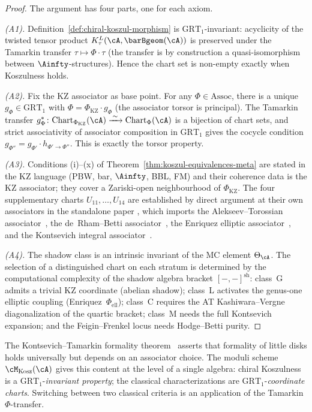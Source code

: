 \begin{proof}
The argument has four parts, one for each axiom.

\emph{(A1).} Definition~\ref{def:chiral-koszul-morphism} is
$\mathrm{GRT}_1$-invariant: acyclicity of the twisted tensor
product $K_\tau^L(\cA, \barBgeom(\cA))$ is preserved under the
Tamarkin transfer $\tau \mapsto \Phi \cdot \tau$ (the transfer
is by construction a quasi-isomorphism between
$\Ainfty$-structures). Hence the chart set is non-empty exactly
when Koszulness holds.

\emph{(A2).} Fix the KZ associator as base point. For any
$\Phi \in \mathrm{Assoc}$, there is a unique
$g_\Phi \in \mathrm{GRT}_1$ with
$\Phi = \Phi_{\mathrm{KZ}} \cdot g_\Phi$ (the associator torsor
is principal). The Tamarkin transfer
$g_\Phi^*\colon
\mathrm{Chart}_{\Phi_{\mathrm{KZ}}}(\cA) \xrightarrow{\;\sim\;}
\mathrm{Chart}_\Phi(\cA)$
is a bijection of chart sets, and strict associativity of
associator composition in $\mathrm{GRT}_1$ gives the cocycle
condition
$g_{\Phi''} = g_{\Phi'} \cdot h_{\Phi' \to \Phi''}$.
This is exactly the torsor property.

\emph{(A3).} Conditions (i)--(x) of
Theorem~\ref{thm:koszul-equivalences-meta} are stated in the KZ
language (PBW, bar, $\Ainfty$, BBL, FM) and their coherence data
is the KZ associator; they cover a Zariski-open neighbourhood
of $\Phi_{\mathrm{KZ}}$. The four supplementary charts
$U_{11}, \ldots, U_{14}$ are established by direct argument at
their own associators in the standalone paper
\cite[Propositions~2.5--2.8]{LorgatMKD1_stand}, which imports
the Alekseev--Torossian associator~\cite{AT12}, the de~Rham--Betti
associator~\cite{Deligne89}, the Enriquez elliptic
associator~\cite{Enriquez14}, and the Kontsevich integral
associator~\cite{Kontsevich93}.

\emph{(A4).} The shadow class is an intrinsic invariant of the
MC element $\Theta_\cA$. The selection of a distinguished chart
on each stratum is determined by the computational complexity
of the shadow algebra bracket $[-,-]^{\mathrm{sh}}$: class~G
admits a trivial KZ coordinate (abelian shadow); class~L
activates the genus-one elliptic coupling
(Enriquez~$\Phi_{\mathrm{ell}}$); class~C requires the AT
Kashiwara--Vergne diagonalization of the quartic bracket; class~M
needs the full Kontsevich expansion; and the Feigin--Frenkel
locus needs Hodge--Betti purity.
\end{proof}

\begin{remark}
\label{rem:kt-reformulation-kp}
The Kontsevich--Tamarkin formality theorem~\cite{Kontsevich99,
Tamarkin03} asserts that formality of little disks holds
universally but depends on an associator choice. The moduli
scheme $\cM_{\mathrm{Kosz}}(\cA)$ gives this content at the level
of a single algebra: chiral Koszulness is a
$\mathrm{GRT}_1$-\emph{invariant property}; the classical
characterizations are $\mathrm{GRT}_1$-\emph{coordinate charts}.
Switching between two classical criteria is an application of
the Tamarkin $\Phi$-transfer.
\end{remark}

